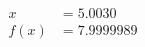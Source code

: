 \documentclass[preview]{standalone}
\begin{document}
\begin{align*}
x &= 5.0030\\f(x) &= 7.9999989
\end{align*}
\end{document}
